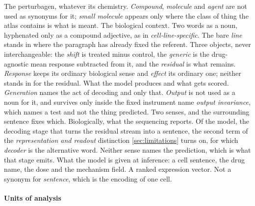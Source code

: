 \begin{description}[leftmargin=1em, itemsep=0.5ex,
                    font=\normalfont\bfseries]
 The perturbagen, whatever its chemistry.
  \emph{Compound}, \emph{molecule} and \emph{agent} are not used as synonyms for
  it; \emph{small molecule} appears only where the class of thing the atlas
  contains is what is meant.
 The biological context. Two words as a noun,
  hyphenated only as a compound adjective, as in \emph{cell-line-specific}. The
  bare \emph{line} stands in where the paragraph has already fixed the referent.
 Three objects, never
  interchangeable: the \emph{shift} is treated minus control, the
  \emph{generic} is the drug-agnostic mean response subtracted from it, and the
  \emph{residual} is what remains. \emph{Response} keeps its ordinary
  biological sense and \emph{effect} its ordinary one; neither stands in for
  the residual.
 What the model produces and what gets scored.
  \emph{Generation} names the act of decoding and only that. \emph{Output} is
  not used as a noun for it, and survives only inside the
  fixed instrument name \emph{output invariance}, which names a test and not
  the thing predicted.
 Two senses, and the surrounding sentence fixes which.
  Biologically, what the sequencing reports. Of the model, the decoding stage
  that turns the residual stream into a sentence, the second term of the
  \emph{representation and readout} distinction \cref{sec:limitations} turns on,
  for which \emph{decoder} is the alternative word. Neither sense names the
  prediction, which is what that stage emits.
 What the model is given at inference: a cell sentence,
  the drug name, the dose and the mechanism field.
 A ranked expression vector. Not a synonym for
  \emph{sentence}, which is the encoding of one cell.
\end{description}

\paragraph{Units of analysis}

